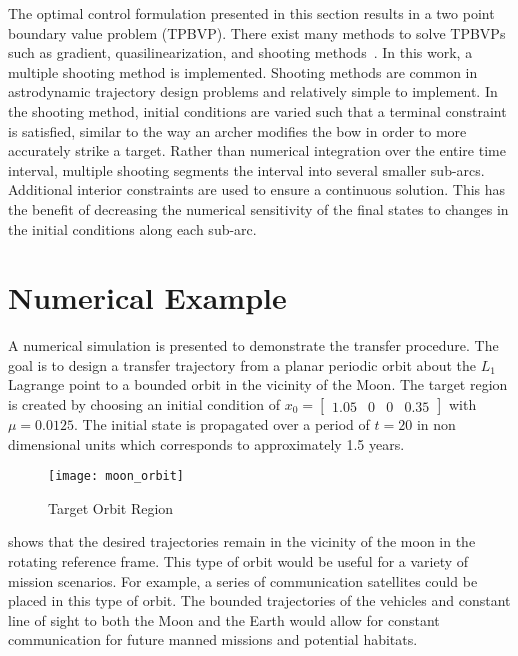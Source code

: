 \documentclass[letterpaper, preprint, paper,11pt]{AAS}	%
\begin{document}
The optimal control formulation presented in this section results in a two point boundary value problem (TPBVP). 
There exist many methods to solve TPBVPs such as gradient, quasilinearization, and shooting methods~\cite{bryson1975}.
In this work, a multiple shooting method is implemented.
Shooting methods are common in astrodynamic trajectory design problems and relatively simple to implement.
In the shooting method, initial conditions are varied such that a terminal constraint is satisfied, similar to the way an archer modifies the bow in order to more accurately strike a target. 
Rather than numerical integration over the entire time interval, multiple shooting segments the interval into several smaller sub-arcs.
Additional interior constraints are used to ensure a continuous solution.
This has the benefit of decreasing the numerical sensitivity of the final states to changes in the initial conditions along each sub-arc.
\section{Numerical Example}\label{sec:simulation}
A numerical simulation is presented to demonstrate the transfer procedure.
The goal is to design a transfer trajectory from a planar periodic orbit about the \( L_1\) Lagrange point to a bounded orbit in the vicinity of the Moon.
The target region is created by choosing an initial condition of \( x_0 = \begin{bmatrix}1.05 & 0 & 0 & 0.35 \end{bmatrix} \) with \( \mu = 0.0125 \).
The initial state is propagated over a period of \( t = \num{20} \) in non dimensional units which corresponds to approximately \num{1.5} years.
\begin{figure}[htbp]
   \centering
   \texttt{[image: moon\_orbit]} %
   \caption{Target Orbit Region}
   \label{fig:moon_orbit}
\end{figure}
 shows that the desired trajectories remain in the vicinity of the moon in the rotating reference frame. 
This type of orbit would be useful for a variety of mission scenarios.
For example, a series of communication satellites could be placed in this type of orbit. 
The bounded trajectories of the vehicles and constant line of sight to both the Moon and the Earth would allow for constant communication for future manned missions and potential habitats.
\end{document}
